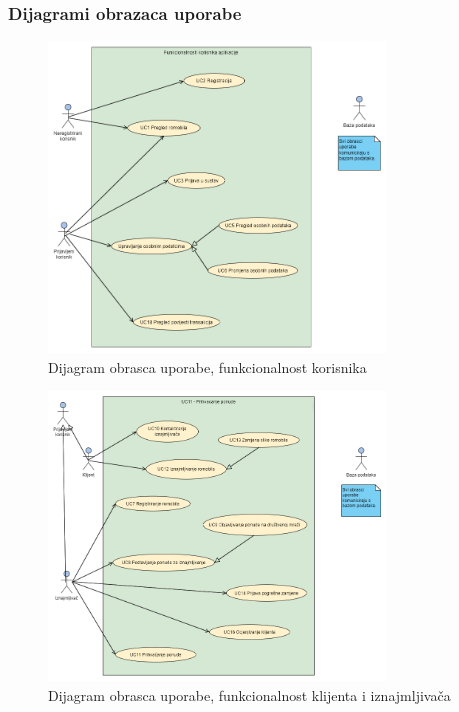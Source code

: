 				\subsubsection{Dijagrami obrazaca uporabe}
				
				
					\begin{figure}[H]
						\centering
						\includegraphics[width=0.8\textwidth]{dijagrami/korisnik.png}
						\caption{Dijagram obrasca uporabe, funkcionalnost korisnika}
						\label{fig:your_label}
					\end{figure}
					
					\begin{figure}[H]
						\centering
						\includegraphics[width=0.8\textwidth]{dijagrami/klijent.png}
						\caption{Dijagram obrasca uporabe, funkcionalnost klijenta i iznajmljivača}
						\label{fig:your_label}
					\end{figure}
					
